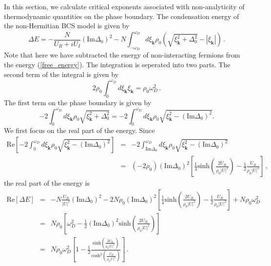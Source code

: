 \documentclass[aps,prl,twocolumn,nofootinbib,superscriptaddress,longbibliography]{revtex4-1}
\begin{document}
In this section, we calculate critical exponents associated with non-analyticity of thermodynamic quantities on the phase boundary. The condensation energy of the non-Hermitian BCS model is given by \cite{Yamamoto2019}
\begin{equation}
 \Delta E = - \frac{N}{U_R + i U_I} \left( \text{Im} \Delta_0 \right)^2
  - N \int_{- \omega_D}^{\omega_D} d \xi_{\bm{k}} \rho_0 \left( \sqrt{\xi_{\bm{k}}^2 +
  \Delta_0^2} - | \xi_{\bm{k}} | \right)\,.\label{free_energy}
\end{equation}
Note that here we have subtracted the energy of non-interacting fermions from the energy (\ref{free_energy}). The integration is seperated into two parts. The second term of the integral is given by
\begin{equation}
  2 \rho_0 \int_0^{\omega_D} d \xi_{\bm{k}} \xi_{\bm{k}} = \rho_0 \omega_D^2\,.
\end{equation}
The first term on the phase boundary is given by
\[ - 2 \int_0^{\omega_D} d \xi_{\bm{k}} \rho_0 \sqrt{\xi_{\bm{k}}^2 + \Delta_0^2} = - 2
   \int_0^{\omega_D} d \xi_{\bm{k}} \rho_0 \sqrt{\xi_{\bm{k}}^2 - \left( \text{Im} \Delta_0
   \right)^2}. \]
We first focus on the real part of the energy. Since
\begin{eqnarray}
  \text{Re}\left[- 2 \int_0^{\omega_D} d \xi_{\bm{k}} \rho_0 \sqrt{\xi_{\bm{k}}^2 - \left( \text{Im}
  \Delta_0 \right)^2}\right] & = & - 2 \int_{\text{Im} \Delta_0}^{\omega_D}
  d \xi_{\bm{k}} \rho_0 \sqrt{\xi_{\bm{k}}^2 - \left( \text{Im} \Delta_0 \right)^2}
  \nonumber\\
  & = & (- 2 \rho_0) \left( \text{Im} \Delta_0 \right)^2 \left[ \frac{1}{4}
  \text{sinh} \left( \frac{2 U_R}{\rho_0 | U |^2} \right) - \frac{1}{2}
  \frac{U_R}{\rho_0 | U |^2} \right]\,,
\end{eqnarray}
the real part of the energy is
\begin{eqnarray}
  \text{Re} [\Delta E] & = & - N \frac{U_R}{| U |^2} \left( \text{Im} \Delta_0
  \right)^2 - 2 N \rho_0 \left( \text{Im} \Delta_0 \right)^2 \left[
  \frac{1}{4} \text{sinh} \left( \frac{2 U_R}{\rho_0 | U |^2} \right) -
  \frac{1}{2} \frac{U_R}{\rho_0 | U |^2} \right] + N \rho_0 \omega_D^2
  \nonumber\\
  & = & N \rho_0 \left[ \omega_D^2 - \frac{1}{2} \left( \text{Im} \Delta_0
  \right)^2 \text{sinh} \left( \frac{2 U_R}{\rho_0 | U |^2} \right) \right]
  \nonumber\\
  & = & N \rho_0 \omega_D^2 \left[ 1 - \frac{1}{2} \frac{\text{sinh} \left(
  \frac{2 U_R}{\rho_0 | U |^2} \right)}{\text{cosh}^2 \left( \frac{U_R}{\rho_0
  | U |^2} \right)} \right]\,.
  \label{free}
\end{eqnarray}
\end{document}
